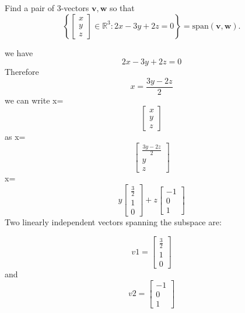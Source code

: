  Find a pair of 3-vectors \(\mathbf{v}, \mathbf{w}\) so that
\[
\left\{
\begin{bmatrix}
x \\
y \\
z
\end{bmatrix}
\in \mathbb{R}^3 : 2x - 3y + 2z = 0
\right\}
= \text{span}(\mathbf{v}, \mathbf{w}).
\]


we have 
\[
 2x - 3y + 2z = 0
\]
 Therefore
\[
 x  = \frac{3y-2z}{2}
\]
we can write x=
\[
\begin{bmatrix}
x \\
y \\
z
\end{bmatrix}
\]
as x=
\[
\begin{bmatrix}
\frac{3y-2z}{2} \\
y \\
z
\end{bmatrix}
\]
x= 
\[
y 
\begin{bmatrix}
\frac{3}{2} \\
1 \\
0
\end{bmatrix}
+ z
\begin{bmatrix}
-1 \\
0 \\
1
\end{bmatrix}
\]
Two linearly independent vectors spanning the subspace are:

\[
v1=
\begin{bmatrix}
\frac{3}{2} \\
1 \\
0
\end{bmatrix}
\]
and
\[
 v2=
\begin{bmatrix}
-1 \\
0 \\
1
\end{bmatrix}
\]
